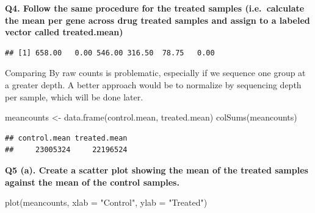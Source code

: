 \documentclass[
]{article}
\newenvironment{Shaded}{\begin{snugshade}}{\end{snugshade}}
\newcommand{\AttributeTok}[1]{\textcolor[rgb]{0.77,0.63,0.00}{#1}}
\newcommand{\FunctionTok}[1]{\textcolor[rgb]{0.00,0.00,0.00}{#1}}
\newcommand{\NormalTok}[1]{#1}
\newcommand{\OtherTok}[1]{\textcolor[rgb]{0.56,0.35,0.01}{#1}}
\newcommand{\SpecialCharTok}[1]{\textcolor[rgb]{0.00,0.00,0.00}{#1}}
\newcommand{\StringTok}[1]{\textcolor[rgb]{0.31,0.60,0.02}{#1}}
\begin{document}
\textbf{Q4. Follow the same procedure for the treated samples
(i.e.~calculate the mean per gene across drug treated samples and assign
to a labeled vector called treated.mean)}

\begin{Shaded}
\end{Shaded}

\begin{verbatim}
## [1] 658.00   0.00 546.00 316.50  78.75   0.00
\end{verbatim}

Comparing By raw counts is problematic, especially if we sequence one
group at a greater depth. A better approach would be to normalize by
sequencing depth per sample, which will be done later.

\begin{Shaded}
\begin{Highlighting}[]
\NormalTok{meancounts }\OtherTok{\textless{}{-}} \FunctionTok{data.frame}\NormalTok{(control.mean, treated.mean)}
\FunctionTok{colSums}\NormalTok{(meancounts)}
\end{Highlighting}
\end{Shaded}

\begin{verbatim}
## control.mean treated.mean 
##     23005324     22196524
\end{verbatim}

\textbf{Q5 (a). Create a scatter plot showing the mean of the treated
samples against the mean of the control samples.}

\begin{Shaded}
\begin{Highlighting}[]
\FunctionTok{plot}\NormalTok{(meancounts, }\AttributeTok{xlab =} \StringTok{"Control"}\NormalTok{, }\AttributeTok{ylab =} \StringTok{"Treated"}\NormalTok{)}
\end{Highlighting}
\end{Shaded}
\end{document}
